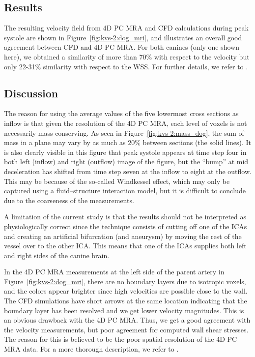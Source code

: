 \subsection{Results}

The resulting velocity field from 4D PC MRA and CFD calculations
during peak systole are shown in Figure~\ref{fig:kvs-2:dog_mri}, and
illustrates an overall good agreement between CFD and 4D PC MRA. For
both canines (only one shown here), we obtained a similarity of more
than 70\% with respect to the velocity but only 22-31\% similarity
with respect to the WSS. For further details, we refer
to \citet{JiangJohnsonValen-SendstadEtAl2010}.

\subsection{Discussion}

The reason for using the average values of the five lowermost cross
sections as inflow is that given the resolution of the 4D PC MRA, each
level of voxels is not necessarily mass conserving. As seen in
Figure~\ref{fig:kvs-2:mass_dog}, the sum of mass in a plane may vary
by as much as 20\% between sections (the solid lines).
It is also clearly visible in this figure that peak systole appears at
time step four in both left (inflow) and right (outflow) image of the
figure, but the ``bump'' at mid deceleration has shifted from time
step seven at the inflow to eight at the outflow.  This may be because
of the so-called Windkessel effect, which may only be captured using a
fluid--structure interaction model, but it is difficult to conclude due
to the coarseness of the measurements.

A limitation of the current study is that the results should not be
interpreted as physiologically correct since the technique consists of
cutting off one of the ICAs and creating an artificial bifurcation
(and aneurysm) by moving the rest of the vessel over to the other
ICA. This means that one of the ICAs supplies both left and right sides
of the canine brain.

In the 4D PC MRA measurements at the left side of the parent artery in
Figure~\ref{fig:kvs-2:dog_mri}, there are no boundary layers due to
isotropic voxels, and the colors appear brighter since high velocities
are possible close to the wall.  The CFD simulations have short arrows
at the same location indicating that the boundary layer has been
resolved and we get lower velocity magnitudes.  This is an obvious
drawback with the 4D PC MRA. Thus, we get a good agreement with the
velocity measurements, but poor agreement for computed wall shear
stresses. The reason for this is believed to be the poor spatial
resolution of the 4D PC MRA data. For a more thorough description, we
refer to \citet{JiangJohnsonValen-SendstadEtAl2010}.

